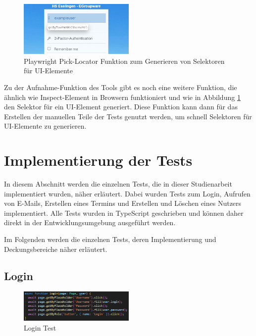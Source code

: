 \begin{figure}[H]
    \centering
    \includegraphics[width=0.5\textwidth]{images/Playwright_PickLocator.png}
    \caption{Playwright Pick-Locator Funktion zum Generieren von Selektoren für UI-Elemente}
    \label{fig:playwright-pick-locator}
\end{figure}

Zu der Aufnahme-Funktion des Tools gibt es noch eine weitere Funktion, die ähnlich wie Inspect-Element in Browsern funktioniert und wie in Abbildung \ref{fig:playwright-pick-locator} den Selektor für ein UI-Element generiert.
Diese Funktion kann dann für das Erstellen der manuellen Teile der Tests genutzt werden, um schnell Selektoren für UI-Elemente zu generieren.



\section{Implementierung der Tests}

In diesem Abschnitt werden die einzelnen Tests, die in dieser Studienarbeit implementiert wurden, näher erläutert.
Dabei wurden Tests zum Login, Aufrufen von E-Mails, Erstellen eines Termins und Erstellen und Löschen eines Nutzers implementiert.
Alle Tests wurden in TypeScript geschrieben und können daher direkt in der Entwicklungsumgebung ausgeführt werden.

Im Folgenden werden die einzelnen Tests, deren Implementierung und Deckungsbereiche näher erläutert.
\newpage
\subsection*{Login}

\begin{figure}[H]
    \centering
    \includegraphics[width=0.5\textwidth]{images/LoginTest.png}
    \caption{Login Test}
    \label{fig:login-test}
\end{figure}

